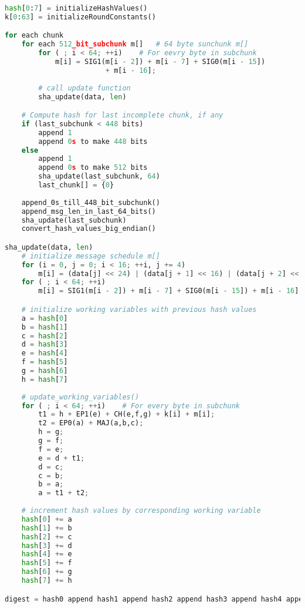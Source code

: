 \documentclass{article}
\begin{document}
\begin{enumerate}
\begin{enumerate}[label=(\alph*)]
\begin{enumerate}[label=(\roman*)]
\begin{lstlisting}[language=python]
hash[0:7] = initializeHashValues()
k[0:63] = initializeRoundConstants()

for each chunk
	for each 512_bit_subchunk m[]	# 64 byte sunchunk m[]
		for ( ; i < 64; ++i)	# For eevry byte in subchunk
			m[i] = SIG1(m[i - 2]) + m[i - 7] + SIG0(m[i - 15]) 
						+ m[i - 16];
		
		# call update function
		sha_update(data, len)

	# Compute hash for last incomplete chunk, if any
	if (last_subchunk < 448 bits)
		append 1
		append 0s to make 448 bits
	else
		append 1
		append 0s to make 512 bits
		sha_update(last_subchunk, 64)
		last_chunk[] = {0}
		
	append_0s_till_448_bit_subchunk()
	append_msg_len_in_last_64_bits()
	sha_update(last_subchunk)
	convert_hash_values_big_endian()		

sha_update(data, len)
	# initialize message schedule m[]
	for (i = 0, j = 0; i < 16; ++i, j += 4)
		m[i] = (data[j] << 24) | (data[j + 1] << 16) | (data[j + 2] << 8) | (data[j + 3]);
	for ( ; i < 64; ++i)
		m[i] = SIG1(m[i - 2]) + m[i - 7] + SIG0(m[i - 15]) + m[i - 16];

	# initialize working variables with previous hash values
	a = hash[0]
	b = hash[1]
	c = hash[2]
	d = hash[3]
	e = hash[4]
	f = hash[5]
	g = hash[6]
	h = hash[7]
		
	# update_working_variables()
	for ( ; i < 64; ++i)	# For every byte in subchunk
		t1 = h + EP1(e) + CH(e,f,g) + k[i] + m[i];
		t2 = EP0(a) + MAJ(a,b,c);
		h = g;
		g = f;
		f = e;
		e = d + t1;
		d = c;
		c = b;
		b = a;
		a = t1 + t2;
		
	# increment hash values by corresponding working variable
	hash[0] += a	
	hash[1] += b
	hash[2] += c
	hash[3] += d	
	hash[4] += e
	hash[5] += f
	hash[6] += g	
	hash[7] += h

digest = hash0 append hash1 append hash2 append hash3 append hash4 append hash5 append hash6 append hash7


\end{lstlisting}
\end{enumerate}
\end{enumerate}
\end{enumerate}
\end{document}
